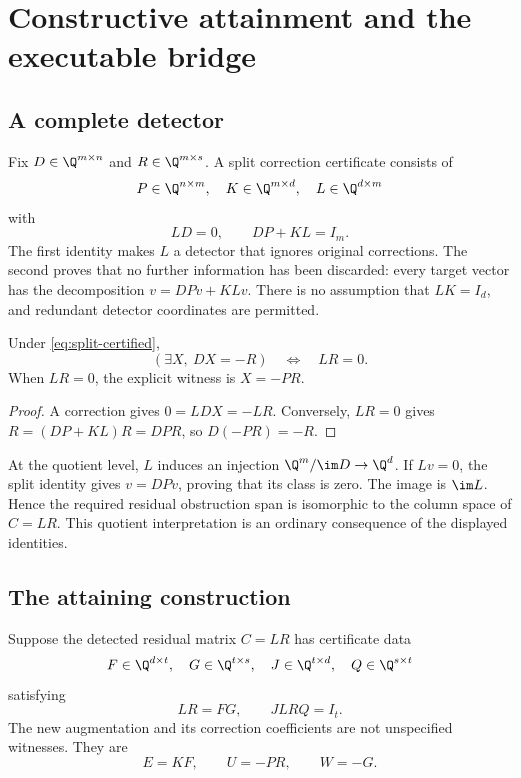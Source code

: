 \chapter{Constructive attainment and the executable bridge}\label{ch:matrix-attainment}
\section{A complete detector}
Fix $D\in\Q^{m\times n}$ and $R\in\Q^{m\times s}$. A split correction certificate consists of
\[
 P\in\Q^{n\times m},\quad K\in\Q^{m\times d},\quad L\in\Q^{d\times m}
\]
with
\begin{equation}\label{eq:split-certified}
 LD=0,\qquad DP+KL=I_m.
\end{equation}
The first identity makes $L$ a detector that ignores original corrections. The second proves that no further information has been discarded: every target vector has the decomposition $v=DPv+KLv$. There is no assumption that $LK=I_d$, and redundant detector coordinates are permitted.

\begin{theorem}\label{thm:split-exact}
Under \eqref{eq:split-certified},
\[
 (\exists X,\ DX=-R)\quad\Longleftrightarrow\quad LR=0.
\]
When $LR=0$, the explicit witness is $X=-PR$.
\end{theorem}
\begin{proof}
A correction gives $0=LDX=-LR$. Conversely, $LR=0$ gives $R=(DP+KL)R=DPR$, so $D(-PR)=-R$.
\end{proof}

At the quotient level, $L$ induces an injection $\Q^m/\im D\to\Q^d$. If $Lv=0$, the split identity gives $v=DPv$, proving that its class is zero. The image is $\im L$. Hence the required residual obstruction span is isomorphic to the column space of $C=LR$. This quotient interpretation is an ordinary consequence of the displayed identities.

\section{The attaining construction}
Suppose the detected residual matrix $C=LR$ has certificate data
\[
 F\in\Q^{d\times t},\quad G\in\Q^{t\times s},\quad
 J\in\Q^{t\times d},\quad Q\in\Q^{s\times t}
\]
satisfying
\begin{equation}\label{eq:factor-certified}
 LR=FG,\qquad JLRQ=I_t.
\end{equation}
The new augmentation and its correction coefficients are not unspecified witnesses. They are
\begin{equation}\label{eq:attaining-formula}
 \boxed{E=KF,\qquad U=-PR,\qquad W=-G.}
\end{equation}

